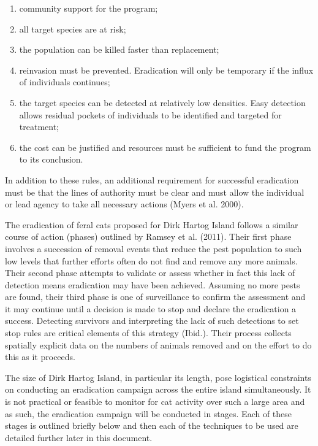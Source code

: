 \documentclass[version=last,
    paper=a4,                               %
    10pt,                                   %
    dvipsnames,
    oneside,                              %
    headings=openany,                       %
    open=any,
    BCOR=7mm,                               %
    DIV=15,     %
]{scrbook}
\begin{document}
\begin{enumerate}
\itemsep1pt\parskip0pt
\item
  community support for the program;
\item
  all target species are at risk;
\item
  the population can be killed faster than replacement;
\item
  reinvasion must be prevented. Eradication will only be temporary if
  the influx of individuals continues;
\item
  the target species can be detected at relatively low densities. Easy
  detection allows residual pockets of individuals to be identified and
  targeted for treatment;
\item
  the cost can be justified and resources must be sufficient to fund the
  program to its conclusion.
\end{enumerate}

In addition to these rules, an additional requirement for successful
eradication must be that the lines of authority must be clear and must
allow the individual or lead agency to take all necessary actions (Myers
et al. 2000).

The eradication of feral cats proposed for Dirk Hartog Island follows a
similar course of action (phases) outlined by Ramsey et al. (2011).
Their first phase involves a succession of removal events that reduce
the pest population to such low levels that further efforts often do not
find and remove any more animals. Their second phase attempts to
validate or assess whether in fact this lack of detection means
eradication may have been achieved. Assuming no more pests are found,
their third phase is one of surveillance to confirm the assessment and
it may continue until a decision is made to stop and declare the
eradication a success. Detecting survivors and interpreting the lack of
such detections to set stop rules are critical elements of this strategy
(Ibid.). Their process collects spatially explicit data on the numbers
of animals removed and on the effort to do this as it proceeds.

The size of Dirk Hartog Island, in particular its length, pose
logistical constraints on conducting an eradication campaign across the
entire island simultaneously. It is not practical or feasible to monitor
for cat activity over such a large area and as such, the eradication
campaign will be conducted in stages. Each of these stages is outlined
briefly below and then each of the techniques to be used are detailed
further later in this document.
\end{document}
